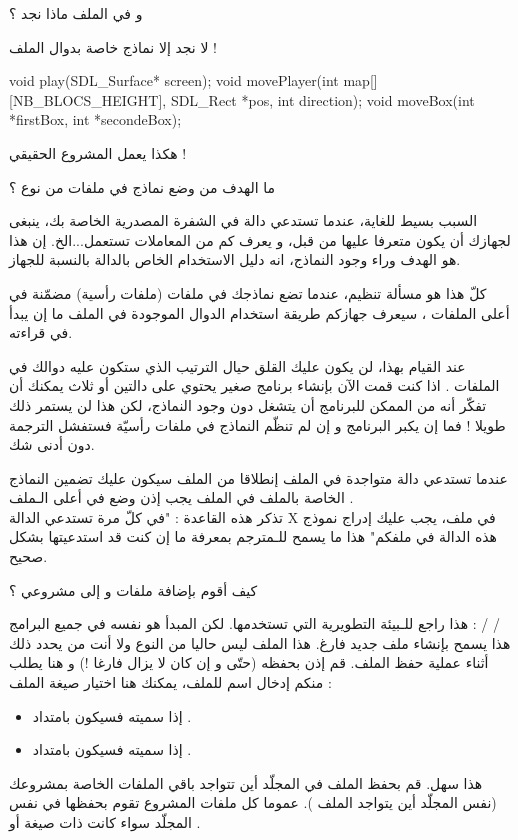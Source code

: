 \begin{question}
  و في الملف
ماذا نجد ؟
\end{question}
لا نجد إلا نماذج خاصة بدوال الملف
!
\begin{Csource}
void play(SDL_Surface* screen);
void movePlayer(int map[][NB_BLOCS_HEIGHT], SDL_Rect *pos, int direction);
void moveBox(int *firstBox, int *secondeBox);
\end{Csource}
هكذا يعمل المشروع الحقيقي !
\begin{question}
  ما الهدف من وضع نماذج في ملفات من نوع
  ؟
\end{question}
السبب بسيط للغاية، عندما تستدعي دالة في الشفرة المصدرية الخاصة بك، ينبغى لجهازك أن يكون متعرفا عليها من قبل، و يعرف كم من المعاملات تستعمل...الخ. إن هذا هو الهدف وراء وجود النماذج، انه دليل الاستخدام الخاص بالدالة بالنسبة للجهاز.

كلّ هذا هو مسألة تنظيم، عندما تضع نماذجك في ملفات
(ملفات رأسية) مضمّنة في أعلى الملفات
، سيعرف جهازكم طريقة استخدام الدوال الموجودة في الملف ما إن يبدأ في قراءته.

عند القيام بهذا، لن يكون عليك القلق حيال الترتيب الذي ستكون عليه دوالك في الملفات
.
اذا كنت قمت الآن بإنشاء برنامج صغير يحتوي على دالتين أو ثلاث يمكنك أن تفكّر أنه من الممكن للبرنامج أن يتشغل دون وجود النماذج، لكن هذا لن يستمر ذلك طويلا ! فما إن يكبر البرنامج و إن لم تنظّم النماذج في ملفات رأسيّة فستفشل الترجمة دون أدنى شك.
\begin{information}
  عندما تستدعي دالة متواجدة في الملف
  إنطلاقا من الملف
  سيكون عليك تضمين النماذج الخاصة بالملف
  في الملف
  يجب إذن وضع
  في أعلى الـملف
  .\\
  تذكر هذه القاعدة : "في كلّ مرة تستدعي الدالة
  \textenglish{X}
  في ملف، يجب عليك إدراج نموذج هذه الدالة في ملفكم" هذا ما يسمح للـمترجم بمعرفة ما إن كنت قد استدعيتها بشكل صحيح.
\end{information}
\begin{question}
  كيف أقوم بإضافة ملفات
 و
 إلى مشروعي ؟
\end{question}
هذا راجع للـبيئة التطويرية التي تستخدمها. لكن المبدأ هو نفسه في جميع البرامج :
 /  / \\
هذا يسمح بإنشاء ملف جديد فارغ. هذا الملف ليس حاليا من النوع
ولا
أنت من يحدد ذلك أثناء عملية حفظ الملف. قم إذن بحفظه (حتّى و إن كان لا يزال فارغا !) و هنا يطلب منكم إدخال اسم للملف، يمكنك هنا اختيار صيغة الملف :
\begin{itemize}
  \item إذا سميته
فسيكون بامتداد
.
  \item إذا سميته
فسيكون بامتداد
.
\end{itemize}
هذا سهل. قم بحفظ الملف في المجلّد أين تتواجد باقي الملفات الخاصة بمشروعك (نفس المجلّد أين يتواجد الملف
). عموما كل ملفات المشروع تقوم بحفظها في نفس المجلّد سواء كانت ذات صيغة
أو
.

